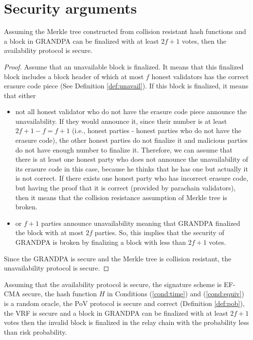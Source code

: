 
\section{Security arguments} %
\label{sec:proofs}


\begin{theorem}[Availability]
Assuming the Merkle tree constructed from collision resistant hash functions and a block in GRANDPA can be finalized with at least $2f+1$ votes, then the availability protocol is secure.
\end{theorem}

\begin{proof}
Assume that an unavailable block is finalized. It means that this finalized block includes a block header of which at most $f$ honest validators has the correct erasure code piece (See Definition \ref{def:unavail}). If this block is finalized, it means that either
\begin{itemize}
    \item not all honest validator who do not have the erasure code piece announce the unavailability. If they would announce it, since their number is at least $2f+1 - f =f+1$ (i.e., honest parties - honest parties who do not have the erasure code), the other honest parties do not finalize it and malicious parties do not have enough number to finalize it. Therefore, we can assume that there is at least one honest party who does not announce the unavailability of its erasure code in this case, because he thinks that he has one but actually it is not correct. If there exists one honest party who has incorrect erasure code, but having the proof that it is correct (provided by parachain validators), then it means that the collision resistance assumption of Merkle tree is broken. 
    
    \item or  $f+1$ parties announce unavailability meaning that GRANDPA finalized the block with at most $2f$  parties. So, this implies that the security of GRANDPA is broken by finalizing a block with less than $2f+1$ votes.
\end{itemize}

Since the GRANDPA is secure and the Merkle tree is collision resistant, the unavailability protocol is secure.
\end{proof}

\begin{theorem}[Validity]
\label{thm:valid}
Assuming that the availability protocol is secure, the signature scheme is EF-CMA secure, the hash function $H$ in Conditions (\ref{cond:time}) and  (\ref{cond:equiv}) is a random oracle, the PoV protocol is secure and correct (Definition \ref{def:pob}), the VRF is secure and a block in GRANDPA can be finalized with at least $2f+1$ votes then the invalid block is finalized in the relay chain with  the probability less than risk probability.
\end{theorem}

